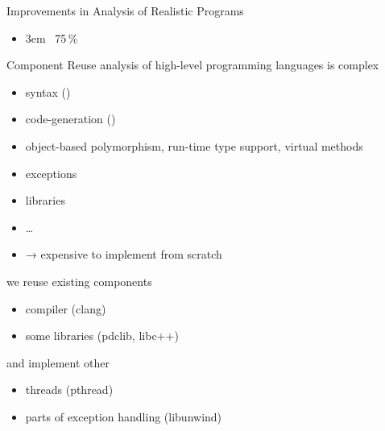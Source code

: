\documentclass[aspectratio=169, fi]{paradise-slide}
\newcommand{\fcite}[1]{\emergencystretch 3em{\protect\NoHyper\cite{#1}}~\fullcite{#1}}
\newenvironment{prespart}[1]{%
  \begin{frame}{}%
    \centering
      {\Large #1} \par\bigskip\bigskip%
}{%
  \end{frame}%
}
\begin{document}
\begin{prespart}{Improvements in Analysis of Realistic Programs}
  \begin{itemize}
    \item \fcite{SRB2017} \hfill 75\,\%
  \end{itemize}
\end{prespart}

\begin{frame}{Component Reuse}
  analysis of high-level programming languages is complex \pause
  \begin{itemize}
    \item syntax () \pause
    \item code-generation () \pause
    \item object-based polymorphism, run-time type support, virtual methods \pause
    \item exceptions \pause
    \item libraries
    \item … \pause
    \item → expensive to implement from scratch
  \end{itemize}

  \pause\bigskip
  we reuse existing components
  \begin{itemize}
    \item compiler (clang)
    \item some libraries (pdclib, libc++)
  \end{itemize}

  and implement other
  \begin{itemize}
    \item threads (pthread)
    \item parts of exception handling (libunwind)
  \end{itemize}
\end{frame}
\end{document}
